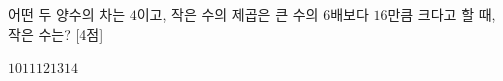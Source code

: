 어떤 두 양수의 차는 $4$이고, 작은 수의 제곱은 큰 수의 $6$배보다 $16$만큼 크다고 할 때, 작은 수는? \mbox{[4점]}
\begin{choices32}{$10$}{$11$}{$12$}{$13$}{$14$}\end{choices32}
